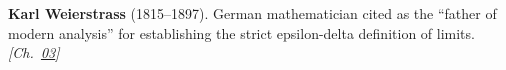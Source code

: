 \textbf{Karl Weierstrass} (1815–1897). German mathematician cited as the ``father of modern analysis'' for establishing the strict epsilon-delta definition of limits. \emph{[Ch.~\hyperref[ch:banach]{03}]}

